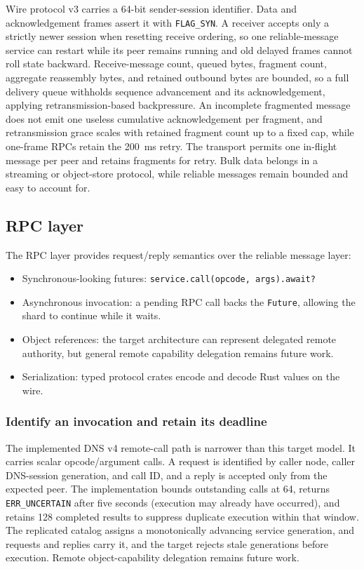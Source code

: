 Wire protocol v3 carries a 64-bit sender-session identifier. Data and
acknowledgement frames assert it with \texttt{FLAG\_SYN}. A receiver accepts
only a strictly newer session when resetting receive ordering, so one
reliable-message service can restart while its peer remains running and old
delayed frames cannot roll state backward. Receive-message count, queued
bytes, fragment count, aggregate reassembly bytes, and retained outbound bytes
are bounded, so a full delivery queue withholds sequence advancement and its
acknowledgement, applying retransmission-based backpressure. An incomplete
fragmented message does not emit one useless cumulative acknowledgement per
fragment, and retransmission grace scales with retained fragment count up to a
fixed cap, while one-frame RPCs retain the 200~ms retry. The transport permits one
in-flight message per peer and retains fragments for retry. Bulk data belongs
in a streaming or object-store protocol, while reliable messages remain bounded
and easy to account for.

\subsection{RPC layer}

The RPC layer provides request/reply semantics over the reliable message layer:

\begin{itemize}
    \item Synchronous-looking futures: \texttt{service.call(opcode, args).await?}
    \item Asynchronous invocation: a pending RPC call backs the
        \texttt{Future}, allowing the shard to continue while it waits.
    \item Object references: the target architecture can represent delegated
        remote authority, but general remote capability delegation remains future
        work.
    \item Serialization: typed protocol crates encode and decode Rust values
        on the wire.
\end{itemize}

\subsubsection{Identify an invocation and retain its deadline}

The implemented DNS v4 remote-call path is narrower than this target model. It
carries scalar opcode/argument calls. A request is identified by
caller node, caller DNS-session generation, and call ID, and a reply is
accepted only from the expected peer. The implementation bounds outstanding
calls at 64, returns \texttt{ERR\_UNCERTAIN} after five seconds (execution may
already have occurred), and retains 128 completed results to suppress duplicate
execution within that window. The replicated catalog assigns a monotonically
advancing service generation, and requests and replies carry it, and the target
rejects stale generations before execution. Remote object-capability
delegation remains future work.

